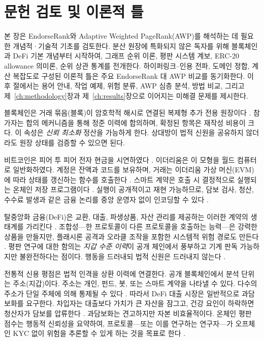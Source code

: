 ﻿%
\chapter{문헌 검토 및 이론적 틀}
\label{ch:literature}

본 장은 EndorseRank와 Adaptive Weighted PageRank(AWP)를 해석하는 데 필요한 개념적·기술적 기초를 검토한다. 분산 원장에 특화되지 않은 독자를 위해 블록체인과 DeFi 기본 개념부터 시작하여, 그래프 순위 이론, 평판 시스템 계보, ERC-20 allowance 의미론, 순위 상관 통계를 전개한다. 하이퍼링크--인용 전파, 도메인 정합, 계산 복잡도로 구성된 이론적 틀은 주요 EndorseRank 대 AWP 비교를 동기화한다. 이후 절에서는 용어 안내, 작업 예제, 위험 분류, AWP 심층 분석, 방법 비교, 그리고 제~\ref{ch:methodology}장과 제~\ref{ch:results}장으로 이어지는 미해결 문제를 제시한다.


블록체인은 거래 묶음(블록)이 암호학적 해시로 연결된 복제형 추가 전용 원장이다 . 참가자는 합의 메커니즘을 통해 정준 이력에 합의하며, 확정된 항목은 재작성 비용이 크다. 이 속성은 \emph{신뢰 최소화} 정산을 가능하게 한다. 상대방이 법적 신원을 공유하지 않더라도 원장 상태를 검증할 수 있으면 된다.

비트코인은 피어 투 피어 전자 현금을 시연하였다 . 이더리움은 이 모형을 월드 컴퓨터로 일반화하였다. 계정은 잔액과 코드를 보유하며, 거래는 이더리움 가상 머신(EVM)에 따라 상태를 갱신하는 함수를 호출한다 . 스마트 계약은 호출 시 결정적으로 실행되는 온체인 저장 프로그램이다 . 실행이 공개적이고 재현 가능하므로, 담보 검사, 청산, 수수료 발생과 같은 금융 논리를 중앙 운영자 없이 인코딩할 수 있다 .

탈중앙화 금융(DeFi)은 교환, 대출, 파생상품, 자산 관리를 제공하는 이러한 계약의 생태계를 가리킨다 . 조합성---한 프로토콜이 다른 프로토콜을 호출하는 능력---은 강력한 상품을 만들지만, 플래시론 공격과 오라클 조작을 포함한 시스템적 위험 경로도 만든다 . 평판 연구에 대한 함의는 \emph{지갑 수준 이력}이 공개 체인에서 풍부하고 기계 판독 가능하지만 불완전하다는 점이다. 행동을 드러내되 법적 신원은 드러내지 않는다 .


전통적 신용 평점은 법적 인격을 상환 이력에 연결한다. 공개 블록체인에서 분석 단위는 주소(지갑)이다. 주소는 개인, 펀드, 봇, 또는 스마트 계약을 나타낼 수 있다. 다수의 주소가 단일 주체에 의해 통제될 수 있다 . 따라서 DeFi 대출 시장은 일반적으로 과담보화를 요구한다. 차입자는 대출보다 가치가 큰 자산을 잠그고, 건강 요인이 하락하면 청산자가 담보를 압류한다 . 과담보화는 견고하지만 자본 비효율적이다. 온체인 평판 점수는 행동적 신뢰성을 요약하여, 프로토콜---또는 이를 연구하는 연구자---가 오프체인 KYC 없이 위험을 추론할 수 있게 하는 것을 목표로 한다 .

